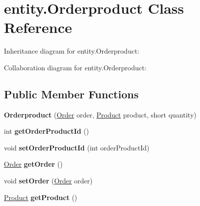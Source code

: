\hypertarget{classentity_1_1_orderproduct}{}\section{entity.\+Orderproduct Class Reference}
\label{classentity_1_1_orderproduct}


Inheritance diagram for entity.\+Orderproduct\+:


Collaboration diagram for entity.\+Orderproduct\+:
\subsection*{Public Member Functions}
\begin{DoxyCompactItemize}
\item 
\mbox{\label{classentity_1_1_orderproduct_a141723329278c6424a1d300db29529a4}} 
{\bfseries Orderproduct} (\mbox{\hyperlink{classentity_1_1_order}{Order}} order, \mbox{\hyperlink{classentity_1_1_product}{Product}} product, short quantity)
\item 
\mbox{\label{classentity_1_1_orderproduct_a08d3bfc82478033cba0386026800358b}} 
int {\bfseries get\+Order\+Product\+Id} ()
\item 
\mbox{\label{classentity_1_1_orderproduct_afb5336d8fb886081876eb8b69970daad}} 
void {\bfseries set\+Order\+Product\+Id} (int order\+Product\+Id)
\item 
\mbox{\label{classentity_1_1_orderproduct_af160d989a7a8c448ce983743a8ee1578}} 
\mbox{\hyperlink{classentity_1_1_order}{Order}} {\bfseries get\+Order} ()
\item 
\mbox{\label{classentity_1_1_orderproduct_ac38152f038c0669a8f2280c6f55fc1bb}} 
void {\bfseries set\+Order} (\mbox{\hyperlink{classentity_1_1_order}{Order}} order)
\item 
\mbox{\label{classentity_1_1_orderproduct_ac8a5d534f8433a8260ea87a85bb00217}} 
\mbox{\hyperlink{classentity_1_1_product}{Product}} {\bfseries get\+Product} ()
\item 
\mbox{\label{classentity_1_1_orderproduct_a4d9fd082a96c982443e6ad4cfb032a61}} 

\end{DoxyCompactItemize}
